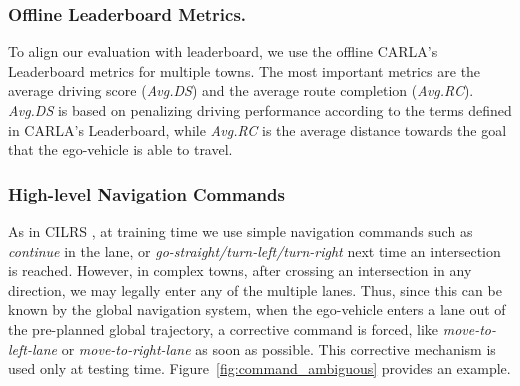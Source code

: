 \subsubsection{Offline Leaderboard Metrics.}\label{lb_metrics}
To align our evaluation with leaderboard\cite{Hu:2022}, we use the offline CARLA's Leaderboard metrics for multiple towns. 
The most important metrics are the average driving score (\emph{Avg.DS}) and the average route completion (\emph{Avg.RC}). 
\emph{Avg.DS} is based on penalizing driving performance according to the terms defined in CARLA's Leaderboard, 
while \emph{Avg.RC} is the average distance towards the goal that the ego-vehicle is able to travel.


\subsubsection{High-level Navigation Commands} 
As in CILRS \cite{Codevilla:2019}, at training time we use simple navigation commands such as \emph{continue} in the lane, or \emph{go-straight/turn-left/turn-right} next time an intersection is reached. 
However, in complex towns, after crossing an intersection in any direction, we may legally enter any of the multiple lanes. 
Thus, since this can be known by the global navigation system, when the ego-vehicle enters a lane out of the pre-planned global trajectory, a corrective command is forced, like \emph{move-to-left-lane} or  \emph{move-to-right-lane} as soon as possible. 
This corrective mechanism is used only at testing time. 
Figure~\ref{fig:command_ambiguous} provides an example.

